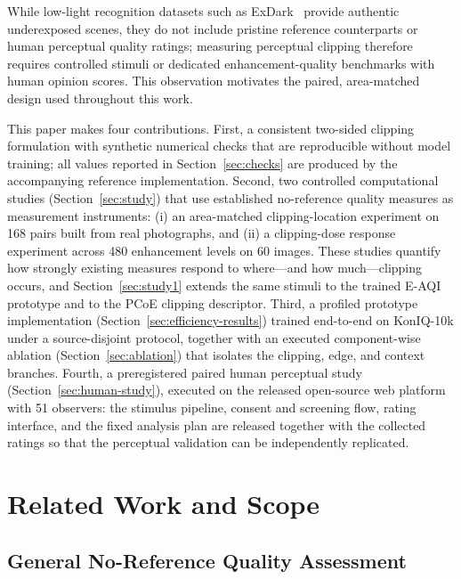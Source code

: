 \documentclass[5p,times,twocolumn]{elsarticle}
\begin{document}
While low-light recognition datasets such as ExDark~\cite{loh2019exdark}
provide authentic underexposed scenes, they do not include pristine reference
counterparts or human perceptual quality ratings; measuring perceptual
clipping therefore requires controlled stimuli or dedicated
enhancement-quality benchmarks with human opinion scores. This observation
motivates the paired, area-matched design used throughout this work.

This paper makes four contributions. First, a consistent two-sided clipping
formulation with synthetic numerical checks that are reproducible without
model training; all values reported in Section~\ref{sec:checks} are produced
by the accompanying reference implementation. Second, two controlled
computational studies (Section~\ref{sec:study}) that use established
no-reference quality measures as measurement instruments: (i) an
area-matched clipping-location experiment on 168 pairs built from real
photographs, and (ii) a clipping-dose response experiment across 480
enhancement levels on 60 images. These studies quantify how strongly
existing measures respond to where---and how much---clipping occurs, and
Section~\ref{sec:study1} extends the same stimuli to the trained E-AQI
prototype and to the PCoE clipping descriptor. Third, a profiled prototype
implementation (Section~\ref{sec:efficiency-results}) trained end-to-end on
KonIQ-10k under a source-disjoint protocol, together with an executed
component-wise ablation (Section~\ref{sec:ablation}) that isolates the
clipping, edge, and context branches. Fourth, a preregistered paired human
perceptual study (Section~\ref{sec:human-study}), executed on the released
open-source web platform with 51 observers: the stimulus pipeline, consent
and screening flow, rating interface, and the fixed analysis plan are
released together with the collected ratings so that the perceptual
validation can be independently replicated.

\section{Related Work and Scope}
\label{sec:related}

\subsection{General No-Reference Quality Assessment}
\end{document}
